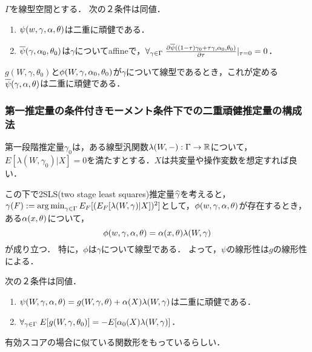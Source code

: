 \documentclass[uplatex,dvipdfmx]{jsreport}
\begin{document}
\begin{theorem}[Gateaux微分のことばで述べ直す]
    $\Gamma$を線型空間とする．
    次の２条件は同値．
    \begin{enumerate}
        \item $\psi(w,\gamma,\alpha,\theta)$は二重に頑健である．
        \item $\overline{\psi}(\gamma,\alpha_0,\theta_0)$は$\gamma$についてaffineで，$\forall_{\gamma\in\Gamma}\;\frac{\partial \overline{\psi}((1-\tau)\gamma_0+\tau\gamma,\alpha_0,\theta_0)}{\partial \tau}|_{\tau=0}=0$．
    \end{enumerate}
\end{theorem}

\begin{corollary}
    $g(W,\gamma,\theta_0)$と$\phi(W,\gamma,\alpha_0,\theta_0)$が$\gamma$について線型であるとき，これが定める$\overline{\psi}(\gamma,\alpha,\theta)$は二重に頑健である．
\end{corollary}

\subsubsection{第一推定量の条件付きモーメント条件下での二重頑健推定量の構成法}

\begin{discussion}
    第一段階推定量$\gamma_0$は，ある線型汎関数$\lambda(W,-):\Gamma\to\mathbb{R}$について，
    $E[\lambda(W,\gamma_0)|X]=0$を満たすとする．$X$は共変量や操作変数を想定すれば良い．

    この下で2SLS(two stage least squares)推定量$\widehat{\gamma}$を考えると，$\gamma(F):=\operatorname*{arg\,min}_{\gamma\in\Gamma}E_F[(E_F[\lambda(W,\gamma)|X])^2]$として，$\phi(w,\gamma,\alpha,\theta)$が存在するとき，ある$\alpha(x,\theta)$について，
    \[\phi(w,\gamma,\alpha,\theta)=\alpha(x,\theta)\lambda(W,\gamma)\]
    が成り立つ．
    特に，$\phi$は$\gamma$について線型である．
    よって，$\psi$の線形性は$g$の線形性による．
\end{discussion}

\begin{theorem}
    次の２条件は同値．
    \begin{enumerate}
        \item $\psi(W,\gamma,\alpha,\theta)=g(W,\gamma,\theta)+\alpha(X)\lambda(W,\gamma)$は二重に頑健である．
        \item $\forall_{\gamma\in\Gamma}\;E[g(W,\gamma,\theta_0)]=-E[\alpha_0(X)\lambda(W,\gamma)]$．
    \end{enumerate}
\end{theorem}
\begin{remarks}
    有効スコアの場合に似ている関数形をもっているらしい．
\end{remarks}
\end{document}
